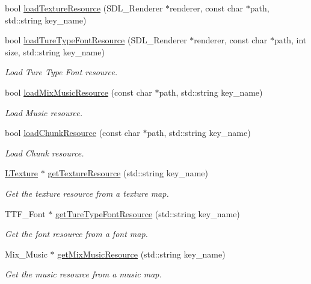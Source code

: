 \begin{DoxyCompactItemize}
bool \mbox{\hyperlink{class_resource_manager_a4e3fc5baab534cea8f334d8eaafb3a3d}{load\+Texture\+Resource}} (S\+D\+L\+\_\+\+Renderer $\ast$renderer, const char $\ast$path, std\+::string key\+\_\+name)
\item 
bool \mbox{\hyperlink{class_resource_manager_aed43ffa83c6e223480ebf752f3db0a43}{load\+Ture\+Type\+Font\+Resource}} (S\+D\+L\+\_\+\+Renderer $\ast$renderer, const char $\ast$path, int size, std\+::string key\+\_\+name)
\begin{DoxyCompactList}\small\item\em Load Ture Type Font resource. \end{DoxyCompactList}\item 
bool \mbox{\hyperlink{class_resource_manager_a125deb8dec47d699ac7bf56c733f8b8b}{load\+Mix\+Music\+Resource}} (const char $\ast$path, std\+::string key\+\_\+name)
\begin{DoxyCompactList}\small\item\em Load Music resource. \end{DoxyCompactList}\item 
bool \mbox{\hyperlink{class_resource_manager_a4023e88b858912a2b61b047e7bfedd42}{load\+Chunk\+Resource}} (const char $\ast$path, std\+::string key\+\_\+name)
\begin{DoxyCompactList}\small\item\em Load Chunk resource. \end{DoxyCompactList}\item 
\mbox{\hyperlink{class_l_texture}{L\+Texture}} $\ast$ \mbox{\hyperlink{class_resource_manager_a2a0e5923f83935e2592c9d138e556912}{get\+Texture\+Resource}} (std\+::string key\+\_\+name)
\begin{DoxyCompactList}\small\item\em Get the texture resource from a texture map. \end{DoxyCompactList}\item 
T\+T\+F\+\_\+\+Font $\ast$ \mbox{\hyperlink{class_resource_manager_a8add69b7cb3c0b1681e27a69c9e5ed4b}{get\+Ture\+Type\+Font\+Resource}} (std\+::string key\+\_\+name)
\begin{DoxyCompactList}\small\item\em Get the font resource from a font map. \end{DoxyCompactList}\item 
Mix\+\_\+\+Music $\ast$ \mbox{\hyperlink{class_resource_manager_a56bdb8ae19ac9732ff05d3c8d6ac2f14}{get\+Mix\+Music\+Resource}} (std\+::string key\+\_\+name)
\begin{DoxyCompactList}\small\item\em Get the music resource from a music map. \end{DoxyCompactList}\item 

\end{DoxyCompactItemize}
